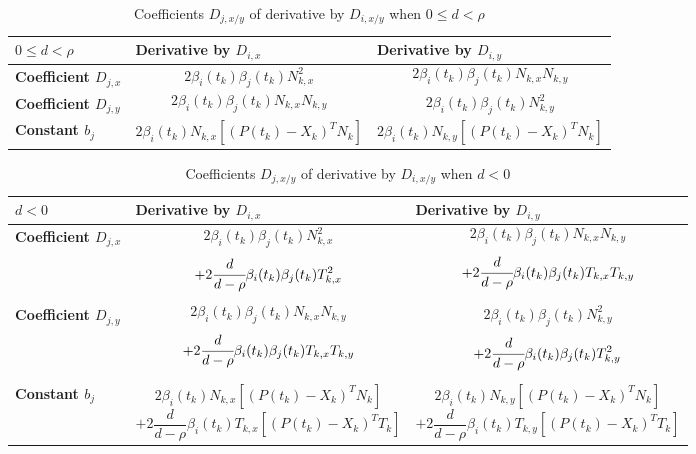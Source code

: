 \documentclass{article}
\begin{document}
\begin{table}[H]
    \centering
    \begin{tabular}{|l|p{6cm}|p{6cm}|}
        \hline
        $0 \leq d < \rho$
        &
        \textbf{Derivative by $D_{i,x}$}
        &
        \textbf{Derivative by $D_{i,y}$}
        \\
        \hline 
        \textbf{Coefficient $D_{j,x}$}
        &
        $$ 2 \beta_i(t_k) \beta_j(t_k) N_{k,x}^2 $$
        &
        $$ 2 \beta_i(t_k) \beta_j(t_k) N_{k,x}N_{k,y} $$
        \\
        \hline 
        \textbf{Coefficient $D_{j,y}$}
        &
        $$ 2 \beta_i(t_k) \beta_j(t_k) N_{k,x}N_{k,y} $$
        &
        $$ 2 \beta_i(t_k) \beta_j(t_k) N_{k,y}^2 $$
        \\
        \hline 
        \textbf{Constant $b_{j}$}
        &
        $$ 2\beta_i(t_k)N_{k,x} [(P(t_k)-X_k)^T N_k] $$
        &
        $$ 2\beta_i(t_k)N_{k,y} [(P(t_k)-X_k)^T N_k] $$
        \\
        \hline
    \end{tabular}
    \caption{Coefficients $D_{j,x/y}$ of derivative by $D_{i,x/y}$ when $0 \leq d < \rho$}
    \label{tab:bspline_lib}
\end{table}

\begin{table}[H]
    \centering
    \begin{tabular}{|l|p{6cm}|p{6cm}|}
        \hline
        $d < 0$
        &
        \textbf{Derivative by $D_{i,x}$}
        &
        \textbf{Derivative by $D_{i,y}$}
        \\
        \hline 
        \textbf{Coefficient $D_{j,x}$}
        &
        $$ 2 \beta_i(t_k) \beta_j(t_k) N_{k,x}^2 $$ 
        $$ + 2 \cfrac{d}{d-\rho} \beta_i(t_k) \beta_j(t_k) T_{k,x}^2 $$
        &
        $$ 2 \beta_i(t_k) \beta_j(t_k) N_{k,x}N_{k,y} $$
        $$ + 2 \cfrac{d}{d-\rho} \beta_i(t_k) \beta_j(t_k) T_{k,x}T_{k,y} $$
        \\
        \hline 
        \textbf{Coefficient $D_{j,y}$}
        &
        $$ 2 \beta_i(t_k) \beta_j(t_k) N_{k,x}N_{k,y} $$
        $$ + 2 \cfrac{d}{d-\rho} \beta_i(t_k) \beta_j(t_k) T_{k,x}T_{k,y} $$
        &
        $$ 2 \beta_i(t_k) \beta_j(t_k) N_{k,y}^2 $$
        $$ + 2 \cfrac{d}{d-\rho} \beta_i(t_k) \beta_j(t_k) T_{k,y}^2 $$
        \\
        \hline 
        \textbf{Constant $b_{j}$}
        &
        $$ 2\beta_i(t_k)N_{k,x} [(P(t_k)-X_k)^T N_k] $$ 
        $$ + 2 \frac{d}{d-\rho} \beta_i(t_k) T_{k,x} [(P(t_k)-X_k)^T T_k] $$
        &
        $$ 2\beta_i(t_k)N_{k,y} [(P(t_k)-X_k)^T N_k] $$
        $$ + 2 \frac{d}{d-\rho} \beta_i(t_k) T_{k,y} [(P(t_k)-X_k)^T T_k] $$
        \\
        \hline
    \end{tabular}
    \caption{Coefficients $D_{j,x/y}$ of derivative by $D_{i,x/y}$ when $d < 0$}
    \label{tab:bspline_lib}
\end{table}
\end{document}
